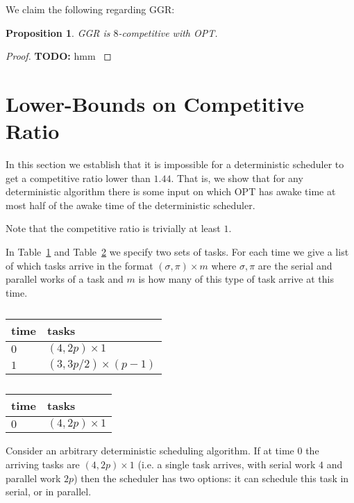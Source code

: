 \documentclass[twocolumn]{article}[10pt]
\newcommand{\todo}[1]{{\color{red}\textbf{TODO:} #1}}
\newtheorem{proposition}{Proposition}
\begin{document}
We claim the following regarding GGR:
\begin{proposition}
  GGR is $8$-competitive with OPT.
\end{proposition}
\begin{proof}
  \todo{
  hmm
}
\end{proof}

\section{Lower-Bounds on Competitive Ratio}

In this section we establish that it is impossible for a
deterministic scheduler to get a competitive ratio lower than
$1.44$. That is, we show that for any deterministic algorithm there
is some input on which OPT has awake time at most half of the
awake time of the deterministic scheduler.

Note that the competitive ratio is trivially at least $1$.

In Table~\ref{tab:lowerboundFork1} and
Table~\ref{tab:lowerboundFork2} we specify two sets of tasks.
For each time we give a list of which tasks arrive in the format
$(\sigma, \pi)\times m$ where $\sigma, \pi$ are the serial and
parallel works of a task and $m$ is how many of this type of task
arrive at this time.

\begin{table}[H]
\caption{}
\label{tab:lowerboundFork1}
\centering
\begin{tabular}{|l|l|}
\hline
time & tasks                    \\ \hline
$0$  & $(4, 2p) \times 1$       \\ \hline
$1$  & $(3, 3p/2) \times (p-1)$ \\ \hline
\end{tabular}
\end{table}

\begin{table}[H]
\caption{}
\label{tab:lowerboundFork2}
\centering
\begin{tabular}{|l|l|}
\hline
time & tasks                    \\ \hline
$0$  & $(4, 2p) \times 1$       \\ \hline
\end{tabular}
\end{table}

Consider an arbitrary deterministic scheduling algorithm. If at
time $0$ the arriving tasks are $(4, 2p)\times 1$ (i.e. a single
task arrives, with serial work $4$ and parallel work $2p$) then
the scheduler has two options: it can schedule this task in
serial, or in parallel.
\end{document}
